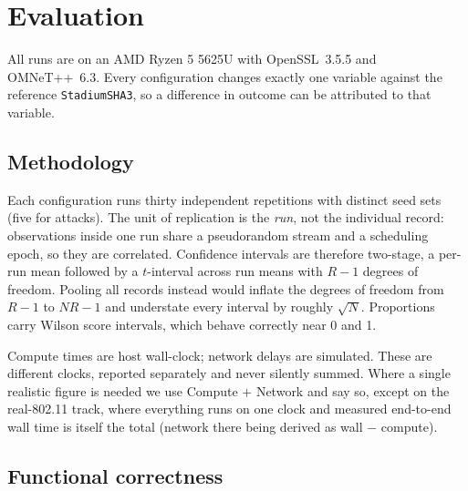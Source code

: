 \documentclass[conference]{IEEEtran}
\begin{document}
\section{Evaluation}
\label{sec:eval}

All runs are on an AMD Ryzen 5 5625U with OpenSSL~3.5.5 and OMNeT++~6.3. Every
configuration changes exactly one variable against the reference
\texttt{StadiumSHA3}, so a difference in outcome can be attributed to that
variable.

\subsection{Methodology}

Each configuration runs thirty independent repetitions with distinct seed sets
(five for attacks). The unit of replication is the \emph{run}, not the
individual record: observations inside one run share a pseudorandom stream and a
scheduling epoch, so they are correlated. Confidence intervals are therefore
two-stage, a per-run mean followed by a $t$-interval across run means with $R-1$
degrees of freedom. Pooling all records instead would inflate the degrees of
freedom from $R-1$ to $NR-1$ and understate every interval by roughly
$\sqrt{N}$. Proportions carry Wilson score intervals, which behave correctly
near 0 and 1.

Compute times are host wall-clock; network delays are simulated. These are
different clocks, reported separately and never silently summed. Where a single
realistic figure is needed we use Compute $+$ Network and say so, except on the
real-802.11 track, where everything runs on one clock and measured end-to-end
wall time is itself the total (network there being derived as wall $-$ compute).

\subsection{Functional correctness}
\end{document}
